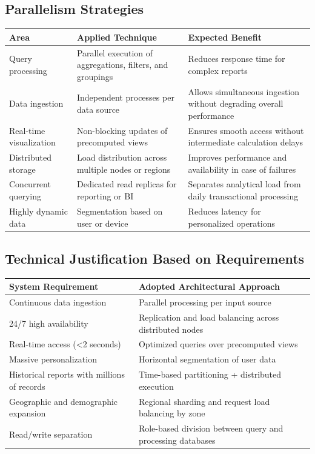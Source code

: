 \subsection{Parallelism Strategies}

\begin{longtable}{@{}p{4cm}p{6cm}p{6cm}@{}}
\toprule
\textbf{Area} & \textbf{Applied Technique} & \textbf{Expected Benefit} \\
\midrule
Query processing & Parallel execution of aggregations, filters, and groupings & Reduces response time for complex reports \\
Data ingestion & Independent processes per data source & Allows simultaneous ingestion without degrading overall performance \\
Real-time visualization & Non-blocking updates of precomputed views & Ensures smooth access without intermediate calculation delays \\
Distributed storage & Load distribution across multiple nodes or regions & Improves performance and availability in case of failures \\
Concurrent querying & Dedicated read replicas for reporting or BI & Separates analytical load from daily transactional processing \\
Highly dynamic data & Segmentation based on user or device & Reduces latency for personalized operations \\
\bottomrule
\end{longtable}

\subsection{Technical Justification Based on Requirements}

\begin{longtable}{@{}p{6.5cm}p{8.5cm}@{}}
\toprule
\textbf{System Requirement} & \textbf{Adopted Architectural Approach} \\
\midrule
Continuous data ingestion & Parallel processing per input source \\
24/7 high availability & Replication and load balancing across distributed nodes \\
Real-time access (<2 seconds) & Optimized queries over precomputed views \\
Massive personalization & Horizontal segmentation of user data \\
Historical reports with millions of records & Time-based partitioning + distributed execution \\
Geographic and demographic expansion & Regional sharding and request load balancing by zone \\
Read/write separation & Role-based division between query and processing databases \\
\bottomrule
\end{longtable}